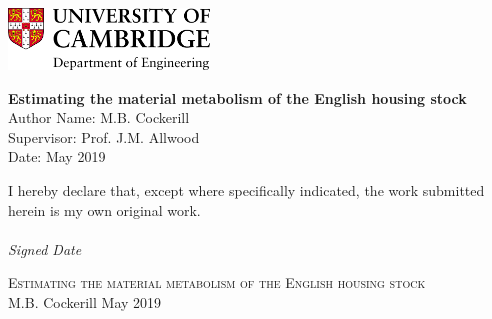 \documentclass[12pt]{article}
\begin{document}

\begin{titlepage}
\includegraphics[width = 0.4\textwidth]{Figures/EngLogo.png}
\vspace{10em}
\begin{flushright}
\Huge
\textbf{Estimating the material metabolism of the English housing stock} \\
\vspace{5em}
\large
Author Name: M.B. Cockerill \\
Supervisor: Prof. J.M. Allwood \\
Date: May 2019 \\
\end{flushright}
\normalsize
\vfill
\noindent
I hereby declare that, except where specifically indicated, the work submitted herein is my own
original work. \\
\\
\noindent
\textit{Signed \hspace{18em} Date}
\end{titlepage}


\begin{center}
 \LARGE{ \textsc{Estimating the material metabolism of the English housing stock}}\\[0.5cm]
 \large{M.B. Cockerill
    \hfill
    May 2019}
\end{center}

\begingroup
\onehalfspacing
\end{document}
